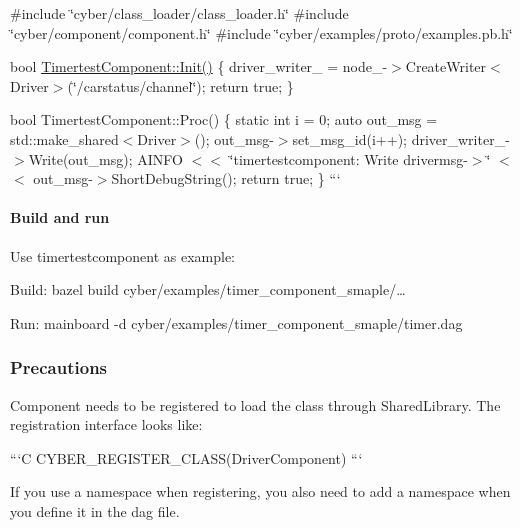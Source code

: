 {\ttfamily \#include \char`\"{}cyber/class\-\_\-loader/class\-\_\-loader.\-h\char`\"{} \#include \char`\"{}cyber/component/component.\-h\char`\"{} \#include \char`\"{}cyber/examples/proto/examples.\-pb.\-h\char`\"{}}

{\ttfamily bool \hyperlink{namespaceapollo_1_1cyber_a2d055a81b338116634deaf8ac3367aca}{Timertest\-Component\-::\-Init()} \{ driver\-\_\-writer\-\_\- = node\-\_\--\/$>$Create\-Writer$<$\-Driver$>$(\char`\"{}/carstatus/channel\char`\"{}); return true; \}}

{\ttfamily bool Timertest\-Component\-::\-Proc() \{ static int i = 0; auto out\-\_\-msg = std\-::make\-\_\-shared$<$\-Driver$>$(); out\-\_\-msg-\/$>$set\-\_\-msg\-\_\-id(i++); driver\-\_\-writer\-\_\--\/$>$Write(out\-\_\-msg); A\-I\-N\-F\-O $<$$<$ \char`\"{}timertestcomponent\-: Write drivermsg-\/$>$\char`\"{} $<$$<$ out\-\_\-msg-\/$>$Short\-Debug\-String(); return true; \} ``` \paragraph*{Build and run}}

{\ttfamily  Use timertestcomponent as example\-:}

{\ttfamily 
\begin{DoxyItemize}
\item Build\-: bazel build cyber/examples/timer\-\_\-component\-\_\-smaple/…
\item Run\-: mainboard -\/d cyber/examples/timer\-\_\-component\-\_\-smaple/timer.\-dag
\end{DoxyItemize}}

{\ttfamily \subsubsection*{Precautions}}

{\ttfamily }

{\ttfamily 
\begin{DoxyItemize}
\item Component needs to be registered to load the class through Shared\-Library. The registration interface looks like\-:
\end{DoxyItemize}}

{\ttfamily ```\-C C\-Y\-B\-E\-R\-\_\-\-R\-E\-G\-I\-S\-T\-E\-R\-\_\-\-C\-L\-A\-S\-S(\-Driver\-Component) ```}

{\ttfamily If you use a namespace when registering, you also need to add a namespace when you define it in the dag file.}

